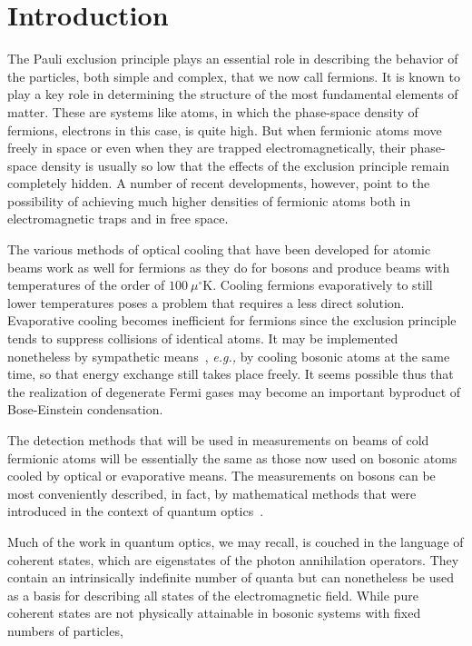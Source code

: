 \documentclass[12pt]{article}
\begin{document}
\section{Introduction}
The Pauli exclusion principle 
plays an essential role in
describing the behavior of the particles,
both simple and complex,
that we now call fermions.
It is known to play a key role in
determining the structure of the most fundamental
elements of matter.
These are systems like atoms,
in which the phase-space density of fermions,
electrons in this case, is quite high.
But when fermionic atoms move freely in space
or even when they are trapped electromagnetically,
their phase-space density is usually so low that the effects
of the exclusion principle remain completely hidden.
A number of recent developments, however,
point to the possibility of achieving much higher densities
of fermionic atoms both in electromagnetic traps
and in free space.
\par
The various methods of optical cooling that
have been developed for atomic beams
work as well for fermions as they do for bosons
and produce beams with temperatures of the order of $100~\mu ^\circ$K.
Cooling fermions evaporatively to still lower temperatures
poses a problem that requires a less direct solution.
Evaporative cooling becomes inefficient
for fermions since the exclusion principle tends
to suppress collisions of identical atoms.
It may be implemented nonetheless by sympathetic means~\cite{symcool},
\emph{e.g.,} by cooling bosonic atoms at the same time,
so that energy exchange still takes place freely.
It seems possible thus that the realization of degenerate Fermi gases
may become an important byproduct of Bose-Einstein condensation.
\par
The detection methods that will be used
in measurements on beams of cold fermionic atoms
will be essentially the same as those
now used on bosonic atoms cooled by optical
or evaporative means.
The measurements on bosons can be most conveniently
described, in fact, by mathematical methods that were
introduced in the context of quantum optics~\cite{rjg2,GDW}.
\par
Much of the work in quantum optics, we may recall,
is couched in the language of coherent states,
which are eigenstates of the photon annihilation operators.
They contain an intrinsically indefinite number
of quanta but can nonetheless be used as a basis
for describing all states of the electromagnetic field.
While pure coherent states are not physically attainable
in bosonic systems with fixed numbers of particles,
\end{document}
